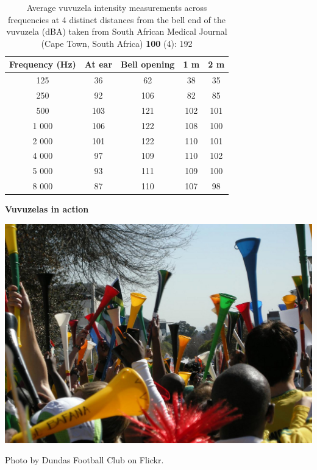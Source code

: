\begin{minipage}{.5\textwidth}
\begin{table}[H]
\begin{tabular}{ccccc}\hline
Frequency (Hz) & At ear & Bell opening & 1 m & 2 m \\ \hline
125&   36  	&62	 &38	& 35 \\ \hline
250&	92 &	106	& 82	&	 85 \\ \hline
500&	103 & 121&	 102&	 101 		\\ \hline
1 000&	106 & 122&	 108&	 100 	\\  \hline
2 000&	101 & 122&	 110&	 101 	\\ \hline
4 000&	97 & 109&	 110&	 102 	\\ \hline
5 000&	93 & 111&	 109&	 100 		\\ \hline
8 000&  87 & 110&	 107&		 98 	\\ \hline
\end{tabular}
\label{table:vuvuzelas}
\caption{Average vuvuzela intensity measurements across frequencies at 4 distinct distances from the bell end of the vuvuzela (dBA) taken from South African Medical Journal (Cape Town, South Africa) \textbf{100} (4): 192}
\end{table}
\end{minipage}
\begin{minipage}{.5\textwidth}
\begin{center}
\textbf{Vuvuzelas in action}\par
\includegraphics[width=.8\columnwidth]{photos/vuvuzelas_dundas_football_club.jpg}\par
Photo by Dundas Football Club on Flickr.	
\end{center}
\end{minipage}

    \label{m38800*cid6}
